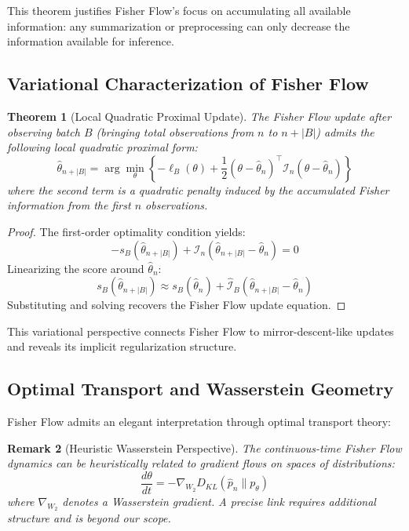 \documentclass[11pt]{article}
\newtheorem{theorem}{Theorem}
\newtheorem{remark}[theorem]{Remark}
\begin{document}
This theorem justifies Fisher Flow's focus on accumulating all available information: any summarization or preprocessing can only decrease the information available for inference.

\subsection{Variational Characterization of Fisher Flow}

\begin{theorem}[Local Quadratic Proximal Update]
\label{thm:proximal}
The Fisher Flow update after observing batch $B$ (bringing total observations from $n$ to $n+|B|$) admits the following local quadratic proximal form:
\begin{equation}
\hat{\theta}_{n+|B|} = \arg\min_{\theta} \left\{-\ell_{B}(\theta) + \frac{1}{2}(\theta - \hat{\theta}_n)^\top \mathcal{I}_n (\theta - \hat{\theta}_n)\right\}
\end{equation}
where the second term is a quadratic penalty induced by the accumulated Fisher information from the first $n$ observations.
\end{theorem}

\begin{proof}
The first-order optimality condition yields:
\begin{equation}
-s_{B}(\hat{\theta}_{n+|B|}) + \mathcal{I}_n(\hat{\theta}_{n+|B|} - \hat{\theta}_n) = 0
\end{equation}
Linearizing the score around $\hat{\theta}_n$:
\begin{equation}
s_{B}(\hat{\theta}_{n+|B|}) \approx s_{B}(\hat{\theta}_n) + \hat{\mathcal{I}}_{B}(\hat{\theta}_{n+|B|} - \hat{\theta}_n)
\end{equation}
Substituting and solving recovers the Fisher Flow update equation.
\end{proof}

This variational perspective connects Fisher Flow to mirror-descent-like updates and reveals its implicit regularization structure.

\subsection{Optimal Transport and Wasserstein Geometry}

Fisher Flow admits an elegant interpretation through optimal transport theory:

\begin{remark}[Heuristic Wasserstein Perspective]
The continuous-time Fisher Flow dynamics can be heuristically related to gradient flows on spaces of distributions:
\begin{equation}
\frac{d\theta}{dt} = -\nabla_{W_2} D_{KL}(\hat{p}_n \| p_\theta)
\end{equation}
where $\nabla_{W_2}$ denotes a Wasserstein gradient. A precise link requires additional structure and is beyond our scope.
\end{remark}
\end{document}
